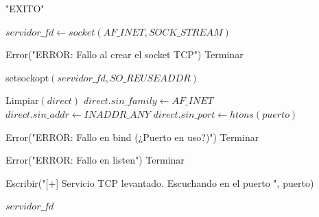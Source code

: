 \begin{tcolorbox}[colback=white, colframe=azul_unam, 
title=Pseudocódigo: funciones.c, breakable]
\begin{algorithmic}[1]
\EndIf

\State \Return "EXITO"

\EndProcedure

\vspace{0.3cm}



\State $servidor\_fd \gets socket(AF\_INET, SOCK\_STREAM)$

    \State Error("ERROR: Fallo al crear el socket TCP")
    \State Terminar
\EndIf

\State setsockopt$(servidor\_fd, SO\_REUSEADDR)$

\State Limpiar$(direct)$
\State $direct.sin\_family \gets AF\_INET$
\State $direct.sin\_addr \gets INADDR\_ANY$
\State $direct.sin\_port \gets htons(puerto)$

    \State Error("ERROR: Fallo en bind (¿Puerto en uso?)")
    \State Terminar
\EndIf

    \State Error("ERROR: Fallo en listen")
    \State Terminar
\EndIf

\State Escribir("[+] Servicio TCP levantado. Escuchando en el puerto ", puerto)

\State \Return $servidor\_fd$

\EndProcedure

\end{algorithmic}
\end{tcolorbox}


